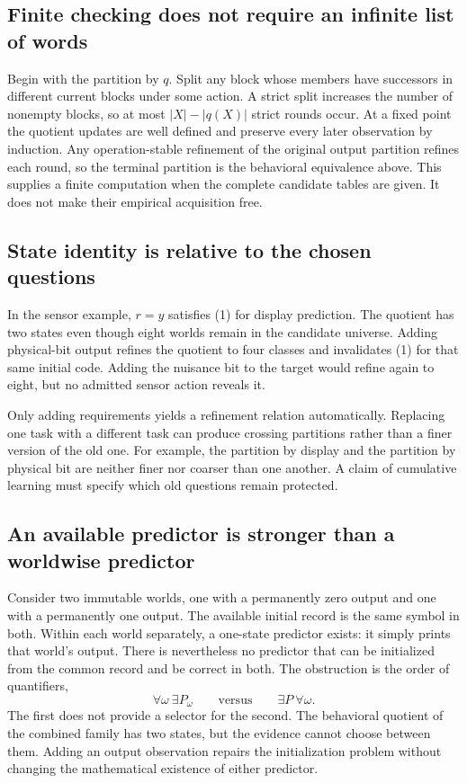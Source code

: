 \subsection{Finite checking does not require an infinite list of words}
Begin with the partition by $q$. Split any block whose members have successors in different current blocks under some action. A strict split increases the number of nonempty blocks, so at most $|X|-|q(X)|$ strict rounds occur. At a fixed point the quotient updates are well defined and preserve every later observation by induction. Any operation-stable refinement of the original output partition refines each round, so the terminal partition is the behavioral equivalence above. This supplies a finite computation when the complete candidate tables are given. It does not make their empirical acquisition free.

\subsection{State identity is relative to the chosen questions}
In the sensor example, $r=y$ satisfies (1) for display prediction. The quotient has two states even though eight worlds remain in the candidate universe. Adding physical-bit output refines the quotient to four classes and invalidates (1) for that same initial code. Adding the nuisance bit to the target would refine again to eight, but no admitted sensor action reveals it.

Only adding requirements yields a refinement relation automatically. Replacing one task with a different task can produce crossing partitions rather than a finer version of the old one. For example, the partition by display and the partition by physical bit are neither finer nor coarser than one another. A claim of cumulative learning must specify which old questions remain protected.

\subsection{An available predictor is stronger than a worldwise predictor}
Consider two immutable worlds, one with a permanently zero output and one with a permanently one output. The available initial record is the same symbol in both. Within each world separately, a one-state predictor exists: it simply prints that world's output. There is nevertheless no predictor that can be initialized from the common record and be correct in both. The obstruction is the order of quantifiers,
\[
\forall\omega\ \exists P_\omega
\qquad\text{versus}\qquad
\exists P\ \forall\omega.
\]
The first does not provide a selector for the second. The behavioral quotient of the combined family has two states, but the evidence cannot choose between them. Adding an output observation repairs the initialization problem without changing the mathematical existence of either predictor.

